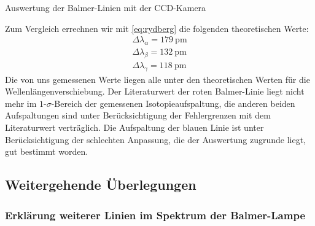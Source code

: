 \documentclass[11pt, a4paper]{article}
\numberwithin{equation}{section}
\begin{document}
\begin{table}[h]
\centering

\caption{Auswertung der Balmer-Linien mit der CCD-Kamera}
\label{tab:balmer_ccd_auswertung}
\end{table}
\noindent
Zum Vergleich errechnen wir mit \eqref{eq:rydberg} die folgenden theoretischen Werte:
\begin{align}
\Delta\lambda_\alpha=\SI{179}{\pico\metre}\\
\Delta\lambda_\beta=\SI{132}{\pico\metre}\\
\Delta\lambda_\gamma=\SI{118}{\pico\metre}
\end{align}
Die von uns gemessenen Werte liegen alle unter den theoretischen Werten für die Wellenlängenverschiebung.
Der Literaturwert der roten Balmer-Linie liegt nicht mehr im $1$-$\sigma$-Bereich der gemessenen Isotopieaufspaltung, die anderen beiden Aufspaltungen sind unter Berücksichtigung der Fehlergrenzen mit dem Literaturwert verträglich.
Die Aufspaltung der blauen Linie ist unter Berücksichtigung der schlechten Anpassung, die der Auswertung zugrunde liegt, gut bestimmt worden.
\FloatBarrier
\subsection{Weitergehende Überlegungen}

\subsubsection{Erklärung weiterer Linien im Spektrum der Balmer-Lampe}
\end{document}
